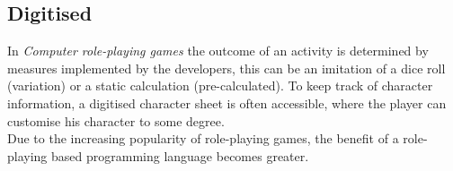 \subsection{Digitised}
In \emph{Computer role-playing games} the outcome of an activity is determined by measures implemented by the developers, this can be an imitation of a dice roll (variation) or a static calculation (pre-calculated).
To keep track of character information, a digitised character sheet is often accessible, where the player can customise his character to some degree.\\
Due to the increasing popularity of role-playing games, the benefit of a role-playing based programming language becomes greater.
\pagebreak


